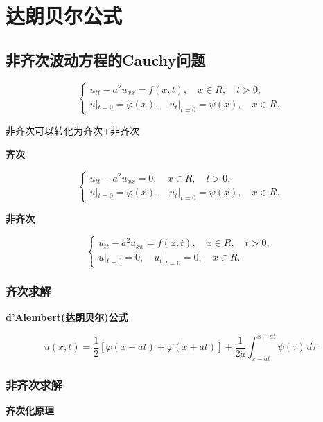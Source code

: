 \section{达朗贝尔公式}

\subsection{非齐次波动方程的Cauchy问题}

\[
\left\{
\begin{aligned}
u_{tt} - a^2 u_{xx} = f(x,t), \quad x \in R , \quad t > 0, \\
u|_{t=0} = \varphi (x), \quad u_t|_{t=0} = \psi (x), \quad x \in R.
\end{aligned}
\right.
\]

非齐次可以转化为齐次+非齐次

\textbf{齐次}

\[
\left\{
\begin{aligned}
u_{tt} - a^2 u_{xx} = 0, \quad x \in R, \quad t > 0, \\
u|_{t=0} = \varphi (x), \quad u_t|_{t=0} = \psi (x), \quad x \in R.
\end{aligned}
\right.
\]

\textbf{非齐次}

\[
\left\{
\begin{aligned}
u_{tt} - a^2 u_{xx} = f(x,t), \quad x \in R, \quad t > 0, \\
u|_{t=0} = 0, \quad u_t|_{t=0} = 0, \quad x \in R.
\end{aligned}
\right.
\]

\subsubsection{齐次求解}

\textbf{d'Alembert(达朗贝尔)公式}

\[
u(x, t) = \frac{1}{2} \left[ \varphi (x - at) + \varphi (x + at) \right] + \frac{1}{2a} \int_{x - at}^{x + at} \psi (\tau ) \, d\tau 
\]

\subsubsection{非齐次求解}

\textbf{齐次化原理}